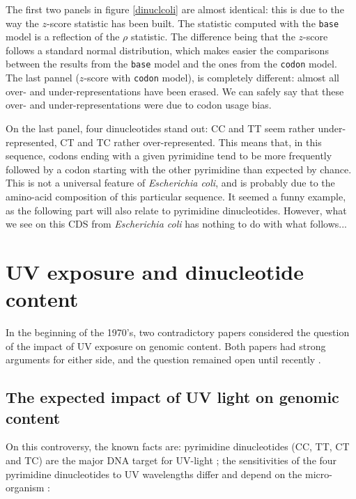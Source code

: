 \documentclass{article}
\begin{document}
The first two panels in figure \ref{dinuclcoli} are almost identical: 
this is due to the way the
$z$-score statistic has been built. The statistic computed with
the \texttt{base} model is a reflection of the $\rho$ statistic. The
difference being that the $z$-score follows a standard normal
distribution, which makes easier the comparisons between the results
from the \texttt{base} model and the ones from the \texttt{codon}
model. The last pannel ($z$-score with \texttt{codon} model), is
completely different: almost all over- and under-representations have
been erased. We can safely say that these over- and
under-representations were due to codon usage bias.

On the last panel, four dinucleotides stand out: CC and TT seem
rather under-represented, CT and TC rather over-represented. This
means that, in this sequence, codons ending with a given pyrimidine
tend to be more frequently followed by a codon starting with the other
pyrimidine than expected by chance. This is not a universal feature of
\textit{Escherichia coli}, and is probably due to the amino-acid
composition of this particular sequence. It seemed a funny example, as
the following part will also relate to pyrimidine dinucleotides.
However, what we see on this CDS from \textit{Escherichia coli} has
nothing to do with what follows...

\section{UV exposure and dinucleotide content}

In the beginning of the 1970's, two contradictory papers considered
the question of the impact of UV exposure on genomic content. Both
papers had strong arguments for either side, and the question remained
open until recently \cite{UV}.

\subsection{The expected impact of UV light on genomic content}

On this controversy, the known facts are: pyrimidine dinucleotides
(CC, TT, CT and TC) are the major DNA target for UV-light
\cite{Setlow}; the sensitivities of the four pyrimidine dinucleotides
to UV wavelengths differ and depend on the micro-organism
\cite{Setlow}:
\end{document}
